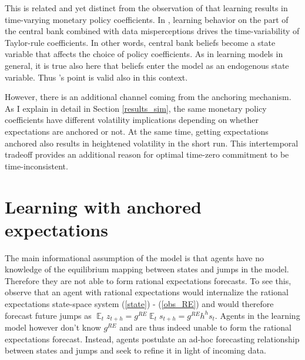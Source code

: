 \documentclass[11pt]{article}
\renewcommand{\[}{\begin{equation}}
\renewcommand{\]}{\end{equation}}
\DeclareMathOperator{\E}{\mathbb{E}}
\begin{document}
This is related and yet distinct from the observation of \cite{LUBIK201685} that learning results in time-varying monetary policy coefficients. In \cite{LUBIK201685}, learning behavior on the part of the central bank combined with data misperceptions drives the time-variability of Taylor-rule coefficients. In other words, central bank beliefs become a state variable that affects the choice of policy coefficients. As in learning models in general, it is true also here that beliefs enter the model as an endogenous state variable. Thus \cite{LUBIK201685}'s point is valid also in this context. 

However, there is an additional channel coming from the anchoring mechanism. As I explain in detail in Section \ref{results_sim}, the same monetary policy coefficients have different volatility implications depending on whether expectations are anchored or not. At the same time, getting expectations anchored also results in heightened volatility in the short run. This intertemporal tradeoff provides an additional reason for optimal time-zero commitment to be time-inconsistent. 

\section{Learning with anchored expectations}\label{learning}
The main informational assumption of the model is that agents have no knowledge of the equilibrium mapping between states and jumps in the model. Therefore they are not able to form rational expectations forecasts. To see this, observe that an agent with rational expectations would internalize the rational expectations state-space system (\ref{state}) - (\ref{obs_RE}) and would therefore forecast future jumps as $\E_t z_{t+h} = g^{RE}\E_ts_{t+h} = g^{RE}h^{h}s_t$. Agents in the learning model however don't know $g^{RE}$ and are thus indeed unable to form the rational expectations forecast. Instead, agents postulate an ad-hoc forecasting relationship between states and jumps and seek to refine it in light of incoming data. 
\end{document}
